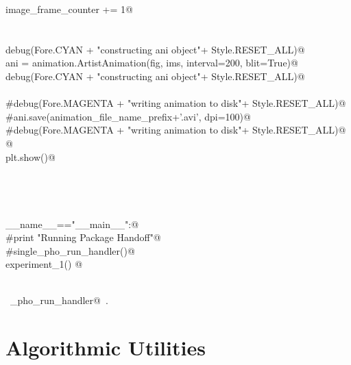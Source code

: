 \documentclass[10.0pt]{report}
\begin{document}
\begin{appendices}
\begin{flushleft}
\begin{list}{}{}
\mbox{}\verb@        image_frame_counter += 1@\\
\mbox{}\verb@@\\
\mbox{}\verb@@\\
\mbox{}\verb@    debug(Fore.CYAN + "\nStarted constructing ani object"+ Style.RESET_ALL)@\\
\mbox{}\verb@    ani = animation.ArtistAnimation(fig, ims, interval=200, blit=True)@\\
\mbox{}\verb@    debug(Fore.CYAN + "\nFinished constructing ani object"+ Style.RESET_ALL)@\\
\mbox{}\verb@@\\
\mbox{}\verb@    #debug(Fore.MAGENTA + "\nStarted writing animation to disk"+ Style.RESET_ALL)@\\
\mbox{}\verb@    #ani.save(animation_file_name_prefix+'.avi', dpi=100)@\\
\mbox{}\verb@    #debug(Fore.MAGENTA + "\nFinished writing animation to disk"+ Style.RESET_ALL)@\\
\mbox{}\verb@    @\\
\mbox{}\verb@    plt.show()@\\
\mbox{}\verb@@\\
\mbox{}\verb@@\\
\mbox{}\verb@@\\
\mbox{}\verb@@\\
\mbox{}\verb@if __name__=="__main__":@\\
\mbox{}\verb@     #print "Running Package Handoff"@\\
\mbox{}\verb@     #single_pho_run_handler()@\\
\mbox{}\verb@     experiment_1() @\\
\mbox{}\verb@@\\
\mbox{}\verb@@{\NWsep}
\end{list}
\vspace{-1.5ex}
\footnotesize
\begin{list}{}{\setlength{\itemsep}{-\parsep}\setlength{\itemindent}{-\leftmargin}}
\item \NWtxtIdentsUsed\nobreak\  \verb@single_pho_run_handler@\nobreak\ .
\item{}
\end{list}
\vspace{4ex}
\end{flushleft}


\section{Algorithmic Utilities}


\end{appendices}
\end{document}

